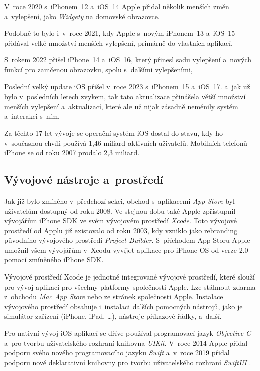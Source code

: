 V~roce 2020 s~iPhonem~12 a~iOS~14 Apple přidal několik menších změn a~vylepšení, jako \emph{Widgety} na domovské obrazovce.

Podobně to bylo i~v~roce 2021, kdy Apple s~novým iPhonem~13 a~iOS~15 přidával velké množství menších vylepšení, primárně do vlastních aplikací.

S~rokem 2022 přišel iPhone~14 a~iOS~16, který přinesl sadu vylepšení a~nových funkcí pro zamčenou obrazovku, spolu s~dalšími vylepšeními,

Poslední velký update iOS přišel v~roce 2023 s~iPhonem~15 a~iOS~17. a~jak už bylo v~posledních letech zvykem, tak tato aktualizace přinášela větší množství menších vylepšení a~aktualizací, které ale už nijak zásadně neměnily systém a~interakci s~ním. \cite{history-of-ios}

Za těchto 17 let vývoje se operační systém iOS dostal do stavu, kdy ho v~současnou chvíli používá 1,46 miliard aktivních uživatelů. Mobilních telefonů iPhone se od roku 2007 prodalo 2,3 miliard. \cite{iphone-user-statistics}

\subsection{Vývojové nástroje a~prostředí}\label{ios-dev-tools}

Jak již bylo zmíněno v~předchozí sekci, obchod s~aplikacemi \emph{App Store} byl uživatelům dostupný od roku 2008. Ve stejnou dobu také Apple zpřístupnil vývojářům iPhone SDK ve svém vývojovém prostředí \emph{Xcode}. Toto vývojové prostředí od Applu již existovalo od roku 2003, kdy vzniklo jako rebranding původního vývojového prostředí \emph{Project Builder}. S~příchodem App Storu Apple umožnil všem vývojářům v~Xcodu vyvíjet aplikace pro iPhone OS od verze 2.0 pomocí zmíněného iPhone SDK. 

Vývojové prostředí Xcode je jednotné integrované vývojové prostředí, které slouží pro vývoj aplikací pro všechny platformy společnosti Apple. Lze stáhnout zdarma z~obchodu \emph{Mac App Store} nebo ze stránek společnosti Apple. Instalace vývojového prostředí obsahuje i~instalaci dalších pomocných nástrojů, jako je simulátor zařízení (iPhone, iPad, \dots), nástroje příkazové řádky, a~další. \cite{xcode-history}

Pro nativní vývoj iOS aplikací se dříve používal programovací jazyk \emph{Objective-C} \cite{objc} a~pro tvorbu uživatelského rozhraní knihovna \emph{UIKit}. V~roce 2014 Apple přidal podporu svého nového programovacího jazyku \emph{Swift} \cite{swift} a~v~roce 2019 přidal podporu nové deklarativní knihovny pro tvorbu uživatelského rozhraní \emph{SwiftUI} \cite{swiftui}.

